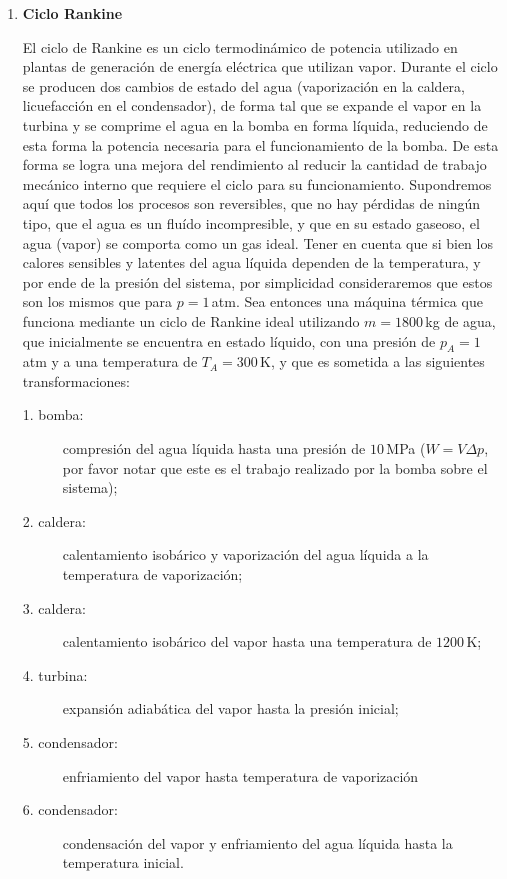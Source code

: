 \documentclass[a4paper,12pt]{article}
\begin{document}
\begin{enumerate}
	\item {\bf{Ciclo Rankine}}

		El ciclo de Rankine es un ciclo termodinámico de potencia utilizado en
		plantas de generación de energía eléctrica que utilizan vapor. Durante
		el ciclo se producen dos cambios de estado del agua (vaporización en la
		caldera, licuefacción en el condensador), de forma tal que se expande
		el vapor en la turbina y se comprime el agua en la bomba en forma
		líquida, reduciendo de esta forma la potencia necesaria para el
		funcionamiento de la bomba. De esta forma se logra una mejora del
		rendimiento al reducir la cantidad de trabajo mecánico interno que
		requiere el ciclo para su funcionamiento. Supondremos aquí que todos
		los procesos son reversibles, que no hay pérdidas de ningún tipo, que
		el agua es un fluído incompresible, y que en su estado gaseoso, el agua
		(vapor) se comporta como un gas ideal. Tener en cuenta que si bien los
		calores sensibles y latentes del agua líquida dependen de la
		temperatura, y por ende de la presión del sistema, por simplicidad
		consideraremos que estos son los mismos que para $p=1$\,atm. Sea
		entonces una máquina térmica que funciona mediante un ciclo de Rankine
		ideal utilizando $m=1800$\,kg de agua, que inicialmente se encuentra en
		estado líquido, con una presión de $p_A=1$\,atm y a una temperatura de
		$T_A=300$\,K, y que es sometida a las siguientes transformaciones: 

		\begin{description}
			\item[1. bomba:]compresión del agua líquida hasta una presión de
				$10$\,MPa ($W=V\Delta p$, por favor notar que este es el trabajo realizado por la bomba sobre el sistema);
			\item[2. caldera:] calentamiento isobárico y vaporización del agua
				líquida a la temperatura de vaporización;
			\item[3. caldera:] calentamiento isobárico del vapor hasta una
				temperatura de $1200$\,K;
			\item[4. turbina:] expansión adiabática del vapor hasta la presión
				inicial;
			\item[5. condensador:] enfriamiento del vapor hasta temperatura de
				vaporización
			\item[6. condensador:] condensación del vapor y enfriamiento del
				agua líquida hasta la temperatura inicial. 
		\end{description}
		

\end{enumerate}
\end{document}
